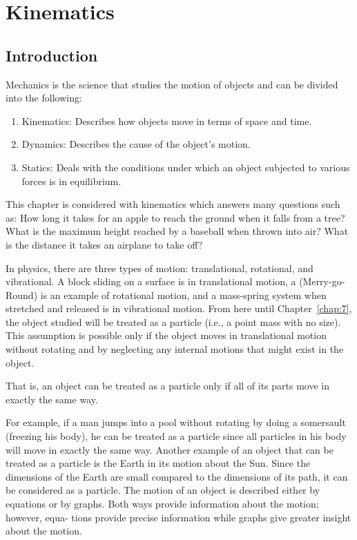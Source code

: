 \documentclass[10pt]{article}
\numberwithin{equation}{section}
\begin{document}
\section{Kinematics}\label{chap:2}
\subsection{Introduction}\label{sec:2-1}
Mechanics is the science that studies the motion of objects and can be divided into the following:

\begin{enumerate}
  \item Kinematics: Describes how objects move in terms of space and time.
  \item Dynamics: Describes the cause of the object's motion.
  \item Statics: Deals with the conditions under which an object subjected to various forces is in equilibrium.
\end{enumerate}

This chapter is considered with kinematics which answers many questions such as: How long it takes for an apple to reach the ground when it falls from a tree? What is the maximum height reached by a baseball when thrown into air? What is the distance it takes an airplane to take off?

In physics, there are three types of motion: translational, rotational, and vibrational. A block sliding on a surface is in translational motion, a (Merry-go-Round) is an example of rotational motion, and a mass-spring system when stretched and released is in vibrational motion. From here until Chapter~\ref{chap:7}, the object studied will be treated as a particle (i.e., a point mass with no size). This assumption is possible only if the object moves in translational motion without rotating and by neglecting any internal motions that might exist in the object.

That is, an object can be treated as a particle only if all of its parts move in exactly the same way.

For example, if a man jumps into a pool without rotating by doing a somersault (freezing his body), he can be treated as a particle since all particles in his body will move in exactly the same way. Another example of an object that can be treated as a particle is the Earth in its motion about the Sun. Since the dimensions of the Earth are small compared to the dimensions of its path, it can be considered as a particle. The motion of an object is described either by equations or by graphs. Both ways provide information about the motion; however, equa- tions provide precise information while graphs give greater insight about the motion.
\end{document}

